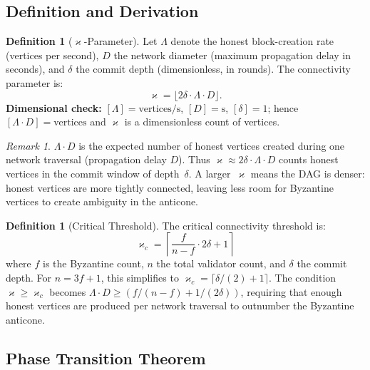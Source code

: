\documentclass[11pt,a4paper]{article}
\theoremstyle{definition}
\newtheorem{definition}[theorem]{Definition}
\theoremstyle{remark}
\newtheorem{remark}[theorem]{Remark}
\renewcommand{\kappa}{\varkappa}
\begin{document}
\subsection{Definition and Derivation}

\begin{definition}[$\kappa$-Parameter]\label{def:kappa}
Let $\Lambda$ denote the honest block-creation rate (vertices per second),
$D$ the network diameter (maximum propagation delay in seconds), and
$\delta$ the commit depth (dimensionless, in rounds).
The connectivity parameter is:
\[
  \kappa = \lfloor 2\delta \cdot \Lambda \cdot D \rfloor.
\]
\textbf{Dimensional check:}
$[\Lambda] = \text{vertices}/\text{s}$, $[D] = \text{s}$,
$[\delta] = 1$; hence $[\Lambda \cdot D] = \text{vertices}$ and
$\kappa$ is a dimensionless count of vertices.
\end{definition}

\begin{remark}\label{rem:kappa-intuition}
$\Lambda \cdot D$ is the expected number of honest vertices created during
one network traversal (propagation delay $D$).
Thus $\kappa \approx 2\delta \cdot \Lambda \cdot D$ counts honest vertices
in the commit window of depth~$\delta$.
A larger~$\kappa$ means the DAG is denser: honest vertices are more
tightly connected, leaving less room for Byzantine vertices to create
ambiguity in the anticone.
\end{remark}

\begin{definition}[Critical Threshold]\label{def:kappa-critical}
The critical connectivity threshold is:
\[
  \kappa_c = \left\lceil \frac{f}{n-f} \cdot 2\delta + 1 \right\rceil
\]
where $f$ is the Byzantine count, $n$ the total validator count, and
$\delta$ the commit depth.
For $n = 3f+1$, this simplifies to $\kappa_c = \lceil \delta/(2) + 1 \rceil$.
The condition $\kappa \geq \kappa_c$ becomes
$\Lambda \cdot D \geq (f/(n-f) + 1/(2\delta))$, requiring that enough
honest vertices are produced per network traversal to outnumber the
Byzantine anticone.
\end{definition}

\subsection{Phase Transition Theorem}
\end{document}
